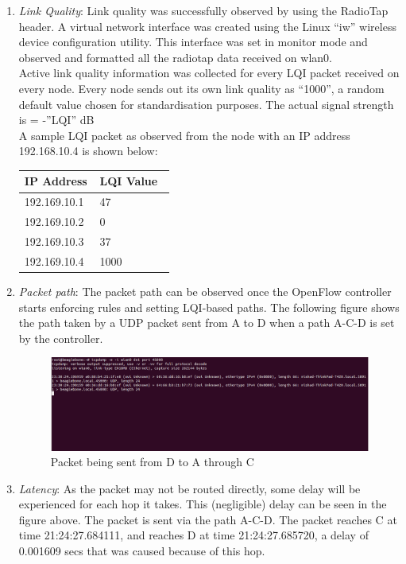 \documentclass{article}
\begin{document}
\begin{enumerate}
\item \textit{Link Quality}: 
Link quality was successfully observed by using the RadioTap header. A virtual network interface was created using the
Linux “iw” wireless device configuration utility. This interface was set in monitor mode and observed and formatted all
the radiotap data received on wlan0.\\

Active link quality information was collected for every LQI packet received on every node. Every node sends out its own
link quality as “1000”, a random default value chosen for standardisation purposes.  The actual signal strength is =
-”LQI” dB \\

A sample LQI packet as observed from the node with an IP address 192.168.10.4 is shown below:\\
\begin{tabular}{ | p{0.49\linewidth} | p{0.49\linewidth} |}
\hline
\textbf{IP Address} & \textbf{LQI Value} \\
\hline\hline
192.169.10.1 & 47 \\
192.169.10.2 & 0 \\
192.169.10.3 & 37 \\
192.169.10.4 & 1000 \\
\hline
\end{tabular}
\item \textit{Packet path}: The packet path can be observed once the OpenFlow controller starts enforcing rules and
setting LQI-based paths. The following figure shows the path taken by a UDP packet sent from A to D when a path A-C-D is
set by the controller.
\begin{figure}[H]
\caption{Packet being sent from D to A through C}
\centering
\includegraphics[width=\textwidth]{test_images/dump_4}
\end{figure}
\item \textit{Latency}: As the packet may not be routed directly, some delay will be experienced for each hop it takes.
This (negligible) delay can be seen in the figure above. The packet is sent via the path A-C-D. The packet reaches C at
time 21:24:27.684111, and reaches D at time 21:24:27.685720, a delay of 0.001609 secs that was caused because of this
hop. 
\end{enumerate}
\end{document}
